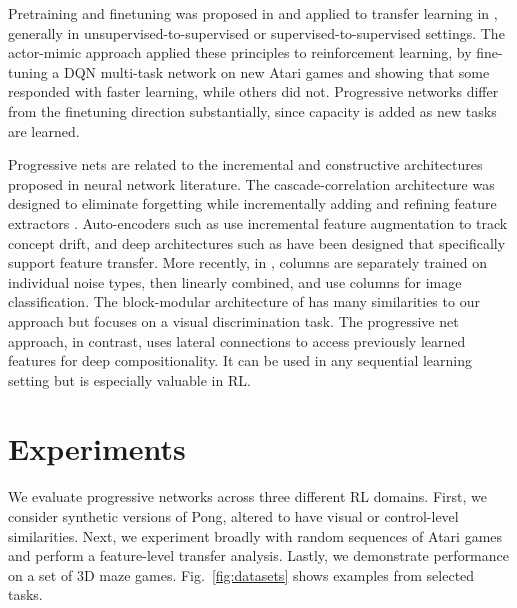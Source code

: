 \documentclass{article}
\begin{document}
Pretraining and finetuning was proposed in \citep{hinton2006science}
and applied to transfer learning in
\citep{Bengio12deeplearning,UTLC+LISA-2011}, generally
in unsupervised-to-supervised or supervised-to-supervised
settings. The actor-mimic approach
\cite{ParisottoICLR16} applied these principles to
reinforcement learning, by fine-tuning a DQN multi-task network on new
Atari games and showing that some responded with faster learning,
while others did not. Progressive networks differ from the
finetuning direction substantially, since capacity is added as new tasks are learned.

Progressive nets are related to the incremental and constructive
architectures proposed in neural network literature. The
cascade-correlation architecture was designed to eliminate forgetting
while incrementally adding and refining feature extractors
\cite{Fahlman1990}.  Auto-encoders such as \citep{ZhouAISTATS12} use
incremental feature augmentation to track concept drift, and deep
architectures such as \citep{RozantsevSF16} have been designed that
specifically support feature transfer.  More recently, in
\cite{Agostinelli_NIPS2013}, columns are separately trained on
individual noise types, then linearly combined, and 
\cite{CiresanMS12} use columns for image classification. The block-modular architecture of \cite{Terekhov2015} has many similarities to our approach but focuses on a visual discrimination task.
The progressive net approach, in contrast, uses lateral connections to access previously learned features for deep compositionality. It can be used in any sequential learning setting but is especially valuable in RL.



\section{Experiments}

We evaluate progressive networks across three different RL domains.
First, we consider synthetic versions of Pong,
altered to have visual or control-level
similarities. Next, we experiment broadly with random
sequences of Atari games and perform a feature-level transfer analysis.
Lastly, we demonstrate performance
on a set of 3D maze games. Fig.~\ref{fig:datasets} shows examples from selected tasks.
\end{document}
